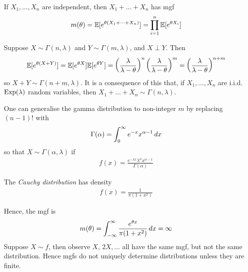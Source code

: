 \documentclass{../template/note}
\begin{document}
    
    \begin{proposition}
        If \(X_1, \dots, X_n\) are independent, then \(X_1 + \dots + X_n\) has mgf
        \begin{align*}
            m(\theta) = \mathbb E[e^{\theta(X_1 + \dots + X_n)}] = \prod_{i=1}^n \mathbb E[e^{\theta X_i}]
        \end{align*}
    \end{proposition}
    
    \begin{example*}
        Suppose \(X \sim \Gamma(n, \lambda)\) and \(Y \sim \Gamma(m, \lambda)\), and \(X \perp Y\). Then
        \begin{align*}
            \mathbb E[e^{\theta(X+Y)}] = \mathbb E[e^{\theta X}]\mathbb E[e^{\theta Y}] = \left(\frac{\lambda}{\lambda-\theta}\right)^n \left(\frac{\lambda}{\lambda-\theta}\right)^m = \left(\frac{\lambda}{\lambda-\theta}\right)^{n+m}
        \end{align*}
        so \(X+Y \sim \Gamma(n+m,\lambda)\). It is a consequence of this that, if \(X_1, \dots, X_n\) are i.i.d. \(\operatorname{Exp}(\lambda)\) random variables, then \(X_1 + \dots + X_n \sim \Gamma(n, \lambda)\).
    \end{example*}
    
    \begin{remark*}
        One can generalise the gamma distribution to non-integer \(m\) by replacing \((n-1)!\) with
        \begin{align*}
            \Gamma(\alpha) = \int_0^{\infty} e^{-x} x^{\alpha-1} \,d{x}
        \end{align*}
        so that \(X \sim \Gamma(\alpha, \lambda)\) if
        \begin{align*}
            f(x) = \frac{e^{-\lambda x}\lambda^{\alpha}x^{\alpha-1}}{\Gamma(\alpha)}
        \end{align*}
    \end{remark*}

    \begin{definition}
        The \emph{Cauchy distribution} has density
        \begin{align*}
            f(x) = \frac{1}{\pi(1+x^2)}
        \end{align*}
    \end{definition}
    Hence, the mgf is
    \begin{align*}
        m(\theta) = \int_{-\infty}^{\infty} \frac{e^{\theta x}}{\pi(1+x^2)} \,d{x} = \infty
    \end{align*}
    Suppose \(X \sim f\), then observe \(X\), \(2X, \dots\) all have the same mgf, but not the same distribution. Hence mgfs do not uniquely determine distributions unless they are finite.
    
\end{document}
